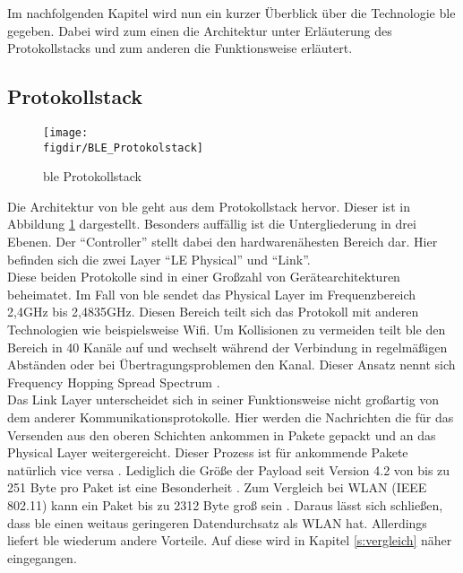 \noindent Im nachfolgenden Kapitel wird nun ein kurzer Überblick über die Technologie \ac{ble} gegeben. Dabei wird zum einen die Architektur unter Erläuterung des Protokollstacks und zum anderen die Funktionsweise erläutert.\\   

\subsection{Protokollstack}
\label{ss:funktionsweise:protokollstack}

\begin{figure}[!b]
	\centering
	\texttt{[image: \\figdir/BLE\_Protokolstack]}
	\caption{\ac{ble} Protokollstack \cite[Seite 16]{Townsend14:GSB}}
	\label{FIG:protokollstack}
\end{figure}

\noindent Die Architektur von \ac{ble} geht aus dem Protokollstack hervor. Dieser ist in Abbildung \ref{FIG:protokollstack} dargestellt. Besonders auffällig ist die Untergliederung in drei Ebenen. Der "`Controller"' stellt dabei den hardwarenähesten Bereich dar. Hier befinden sich die zwei Layer "`LE Physical"' und "`Link"'.\\

\noindent Diese beiden Protokolle sind in einer Großzahl von Gerätearchitekturen beheimatet. Im Fall von \ac{ble} sendet das Physical Layer im Frequenzbereich 2,4GHz bis 2,4835GHz. Diesen Bereich teilt sich das Protokoll mit anderen Technologien wie beispielsweise Wifi. Um Kollisionen zu vermeiden teilt \ac{ble} den Bereich in 40 Kanäle auf und wechselt während der Verbindung in regelmäßigen Abständen oder bei Übertragungsproblemen den Kanal. Dieser Ansatz nennt sich Frequency Hopping Spread Spectrum \cite[Seite 16f]{Townsend14:GSB}.\\  

\noindent Das Link Layer unterscheidet sich in seiner Funktionsweise nicht großartig von dem anderer Kommunikationsprotokolle. Hier werden die Nachrichten die für das  Versenden aus den oberen Schichten ankommen in Pakete gepackt und an das Physical Layer weitergereicht. Dieser Prozess ist für ankommende Pakete natürlich vice versa \cite[Seit 194]{Tanenbaum14:CN}. Lediglich die Größe der Payload seit Version 4.2 von bis zu 251 Byte pro Paket ist eine Besonderheit \cite{Gupta20:WWW}. Zum Vergleich bei WLAN (IEEE 802.11) kann ein Paket bis zu 2312 Byte groß sein \cite[Seite 233]{Gessler15:WNN}. Daraus lässt sich schließen, dass \ac{ble} einen weitaus geringeren Datendurchsatz als WLAN hat. Allerdings liefert \ac{ble} wiederum andere Vorteile. Auf diese wird in Kapitel \ref{s:vergleich} näher eingegangen.\\

